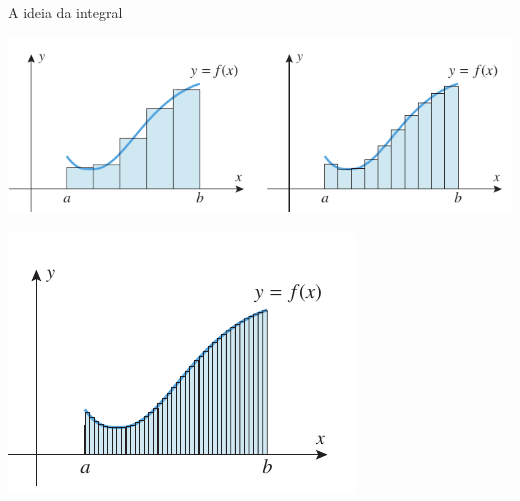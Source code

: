 \begin{frame}[label=area-circulo]{A ideia da integral}


\begin{center}
\includegraphics[scale=.55]{figuras/soma-rieman1.png}

\includegraphics[scale=.55]{figuras/soma-rieman2.png}
\end{center}

\end{frame}


